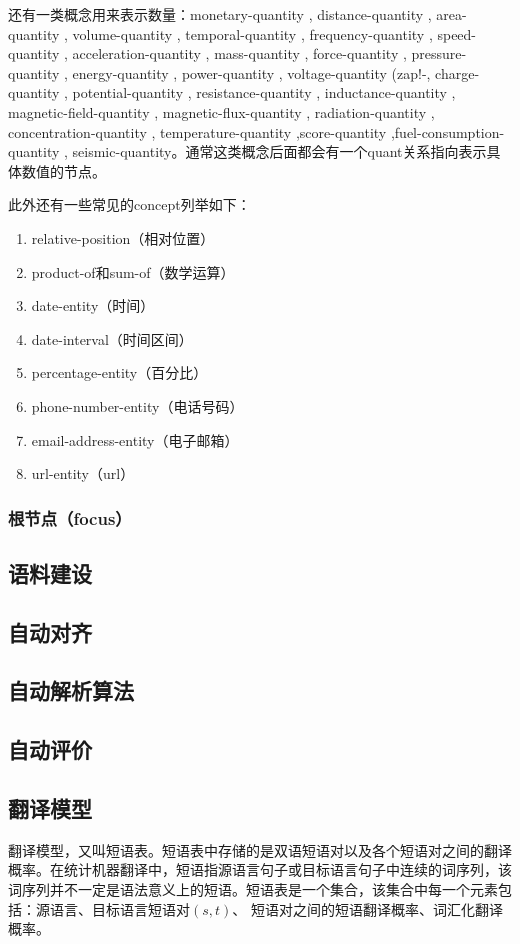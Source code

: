 \documentclass[master, winfont]{njuthesis}
\begin{document}
还有一类概念用来表示数量：monetary-quantity , distance-quantity , area-quantity , volume-quantity , temporal-quantity , frequency-quantity , speed-quantity , acceleration-quantity , mass-quantity , force-quantity , pressure-quantity , energy-quantity , power-quantity , voltage-quantity (zap!-, charge-quantity , potential-quantity , resistance-quantity , inductance-quantity , magnetic-field-quantity , magnetic-flux-quantity , radiation-quantity , concentration-quantity , temperature-quantity ,score-quantity ,fuel-consumption-quantity , seismic-quantity。通常这类概念后面都会有一个quant关系指向表示具体数值的节点。

此外还有一些常见的concept列举如下：
\begin{enumerate}
	\item relative-position（相对位置）
	\item product-of和sum-of（数学运算）
	\item date-entity（时间）
	\item date-interval（时间区间）
	\item percentage-entity（百分比）
	\item phone-number-entity（电话号码）
	\item email-address-entity（电子邮箱）
	\item url-entity（url）
\end{enumerate}


\subsubsection{根节点（focus）}

\subsection{语料建设}

\subsection{自动对齐}

\subsection{自动解析算法}

\subsection{自动评价}

\subsection{翻译模型}\label{section:tmextract}
翻译模型，又叫短语表。短语表中存储的是双语短语对以及各个短语对之间的翻译概率\cite{marcu2002phrase}。在统计机器翻译中，短语指源语言句子或目标语言句子中连续的词序列，该词序列并不一定是语法意义上的短语。短语表是一个集合，该集合中每一个元素包括：源语言、目标语言短语对$(s,t)$、 短语对之间的短语翻译概率、词汇化翻译概率。
\end{document}
